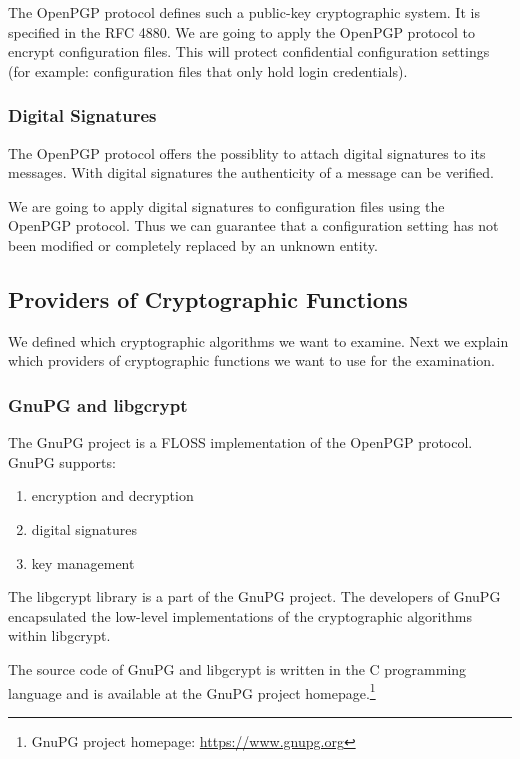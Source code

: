 The OpenPGP protocol defines such a public-key cryptographic system.
It is specified in the RFC 4880.\cite{rfc4880}
We are going to apply the OpenPGP protocol to encrypt configuration files.
This will protect confidential configuration settings (for example: configuration files that only hold login credentials).

\subsubsection{Digital Signatures}

The OpenPGP protocol offers the possiblity to attach digital signatures to its messages.\cite{rfc4880}
With digital signatures the authenticity of a message can be verified.\cite{bruceschneier1996,stallings2014}

We are going to apply digital signatures to configuration files using the OpenPGP protocol.
Thus we can guarantee that a configuration setting has not been modified or completely replaced by an unknown entity.

\subsection{Providers of Cryptographic Functions}
\label{intro-provider}

We defined which cryptographic algorithms we want to examine.
Next we explain which providers of cryptographic functions we want to use for the examination.

  \subsubsection{GnuPG and libgcrypt}

The GnuPG project is a FLOSS implementation of the OpenPGP protocol.
GnuPG supports:\cite{gnupg-doc}
\begin{enumerate}
\item encryption and decryption
\item digital signatures
\item key management
\end{enumerate}

The libgcrypt library is a part of the GnuPG project.
The developers of GnuPG encapsulated the low-level implementations of the cryptographic algorithms within libgcrypt.

The source code of GnuPG and libgcrypt is written in the C programming language and is available at the GnuPG project homepage.\footnote{GnuPG project homepage: \url{https://www.gnupg.org}}


